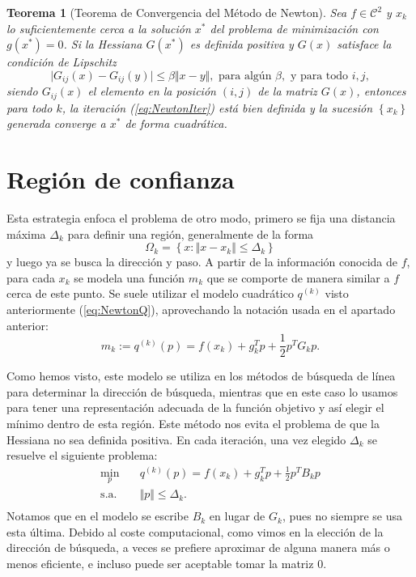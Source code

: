 \documentclass[11pt,a4paper]{book}
\newtheorem{theorem}{Teorema}[chapter]
\theoremstyle{definition}
\theoremstyle{remark}
\begin{document}
\begin{theorem}[Teorema de Convergencia del Método de Newton]
	Sea
	$f \in \mathcal{C}^2$ y $x_k$ lo suficientemente cerca a
	la solución $x^*$ del problema de minimización con
	$g(x^*)=0$. Si la Hessiana $G(x^*)$ es definida positiva y
	$G(x)$ satisface la condición de Lipschitz
	\begin{equation}
		\vert G_{ij}(x) - G_{ij}(y) \vert \leq 
		\beta \Vert x-y \Vert,
		\text{ para algún } \beta,
		\text{ y para todo } i,j,
	\end{equation}
	siendo $G_{ij}(x)$ el elemento en la posición $(i,j)$ de la matriz
	$G(x)$, entonces para todo $k$, la iteración (\ref{eq:NewtonIter})
	está bien definida y la sucesión $\left\{ x_k \right\}$
	generada converge a $x^*$ de forma cuadrática.
\end{theorem}

\section{Región de confianza}

Esta estrategia enfoca el problema de otro modo, primero se fija una distancia máxima $\Delta_k$ para definir una región, generalmente de la forma
\begin{equation}
	\Omega_k = \left\{x : \Vert x-x_k \Vert \leq \Delta_k \right\}
\end{equation}
y luego ya se busca la dirección y paso.
A partir de la información conocida de $f$, para cada $x_k$ se modela una función $m_k$ que se comporte de manera similar a $f$ cerca de este punto.
Se suele utilizar el modelo cuadrático $q^{(k)}$ visto anteriormente (\ref{eq:NewtonQ}), aprovechando la notación usada en el apartado anterior:
\begin{equation}
	m_k := q^{(k)}(p) = f(x_k) + g^T_kp + \frac{1}{2}p^TG_kp.
\end{equation}

Como hemos visto, este modelo se utiliza en los métodos de búsqueda de línea para determinar la dirección de búsqueda, mientras que en este caso lo usamos para tener una representación adecuada de la función objetivo y así elegir el mínimo dentro de esta región.
Este método nos evita el problema de que la Hessiana no sea definida positiva.
En cada iteración, una vez elegido $\Delta_k$ se resuelve el siguiente problema:
\begin{equation}
\begin{aligned}
	\min_{p} \quad & q^{(k)}(p) = f(x_k) + g^T_kp + \frac{1}{2}p^TB_kp \\
	\text{s.a.} \quad & \Vert p \Vert \leq \Delta_k. \\
\end{aligned}
\end{equation}
Notamos que en el modelo se escribe $B_k$ en lugar de $G_k$, pues no siempre se usa esta última.
Debido al coste computacional, como vimos en la elección de la dirección de búsqueda, a veces se prefiere aproximar de alguna manera más o menos eficiente, e incluso puede ser aceptable tomar la matriz $0$.
\end{document}
